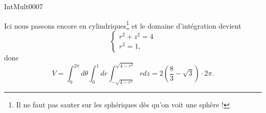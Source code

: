 
\begin{corrige}{IntMult0007}

	Ici nous passons encore en cylindriques\footnote{Il ne faut pas sauter sur les sphériques dès qu'on voit une sphère !} et le domaine d'intégration devient
	\begin{equation}
		\left\{
		\begin{array}{ll}
			r^2+z^2=4\\
			r^2=1,
		\end{array}
		\right.
	\end{equation}
	donc
	\begin{equation}
		V=\int_{0}^{2\pi}d\theta\int_0^1dr\int_{-\sqrt{4-r^2}}^{\sqrt{4-r^2}}rdz=2\left( \frac{ 8 }{ 3 }-\sqrt{3} \right)\cdot 2\pi.
	\end{equation}
	
\end{corrige}
